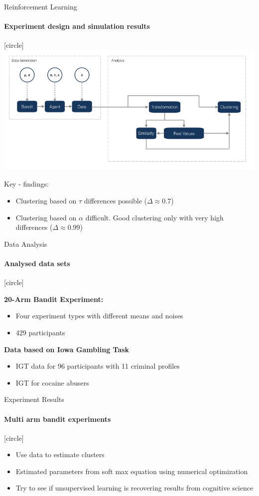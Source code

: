 \documentclass[11pt]{beamer}
\begin{document}
\begin{frame}{Reinforcement Learning}
	\framesubtitle{Experiment design and simulation results}
	[circle]
	\hspace*{-0.06in}
	\includegraphics[scale=0.35]{Pictures/f2.jpeg}
	
		Key - findings:
		\begin{itemize}
			\item Clustering based on $\tau$ differences possible ($\Delta \approx 0.7$) 
			\item Clustering based on $\alpha$ difficult. Good clustering only with very high differences ($\Delta \approx 0.99$)
		\end{itemize} 
\end{frame}


\begin{frame}{Data Analysis}
	\framesubtitle{Analysed data sets}
	[circle]
	
	\textbf{20-Arm Bandit Experiment:}
	\begin{itemize}
		\item Four experiment types with different means and noises
		\item 429 participants 
	\end{itemize} 
	
	\textbf{Data based on Iowa Gambling Task }
	\begin{itemize}
		\item IGT data for 96 participants with 11 criminal profiles
		\item IGT for cocaine abusers
	\end{itemize} 
\end{frame}

\begin{frame}{Experiment Results}
	\framesubtitle{Multi arm bandit experiments}
	[circle]
	
	\begin{itemize}
		\item Use data to estimate clusters 
		\item Estimated parameters from soft max equation using numerical optimization
		\item Try to see if unsupervised learning is recovering results from cognitive science
	\end{itemize}

\end{frame}
\end{document}
